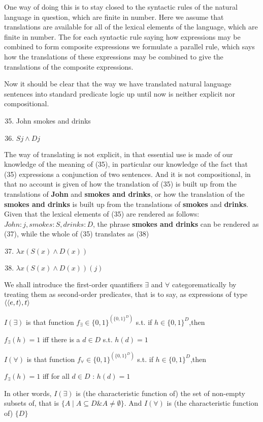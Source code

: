 \documentclass[11pt]{article}
\begin{document}
One way of doing this is to stay closed to the syntactic rules of the
natural language in question, which are finite in number. Here we assume
that translations are available for all of the lexical elements of the
language, which are finite in number. The for each syntactic rule saying how
expressions may be combined to form composite expressions we formulate a
parallel rule, which says how the translations of these expressions may be
combined to give the translations of the composite expressions.

Now it should be clear that the way we have translated natural language
sentences into standard predicate logic up until now is neither explicit nor
compositional.
\begin{enumerate}
\setcounter{enumi}{34}
\item John smokes and drinks
\item \(Sj\wedge Dj\)
\end{enumerate}


The way of translating is not explicit, in that essential use is made of our
knowledge of the meaning of (35), in particular our knowledge of the fact
that (35) expressions a conjunction of two sentences. And it is not
compositional, in that no account is given of how the translation of (35) is
built up from the translations of \textbf{John} and \textbf{smokes and drinks}, or how the
translation of the \textbf{smokes and drinks} is built up from the translations of
\textbf{smokes} and \textbf{drinks}. Given that the lexical elements of (35) are rendered as
follows: \(John:j,smokes:S,drinks:D\), the phrase \textbf{smokes and drinks} can be
rendered as (37), while the whole of (35) translates as (38)
\begin{enumerate}
\setcounter{enumi}{36}
\item \(\lambda x(S(x)\wedge D(x))\)
\item \(\lambda x(S(x)\wedge D(x))(j)\)
\end{enumerate}


We shall introduce the first-order quantifiers \(\exists\) and \(\forall\)
categorematically by treating them as second-order predicates, that is to
say, as expressions of type \(\langle\langle e,t\rangle,t\rangle\)
\begin{center}
\(I(\exists)\) is that function \(f_{\exists}\in\{0,1\}^{(\{0,1\}^D)}\) s.t.
if \(h\in\{0,1\}^D\),then \par
\(f_\exists(h)=1\) iff there is a \(d\in D\) s.t. \(h(d)=1\) \par
\(I(\forall)\) is that function \(f_{\forall}\in\{0,1\}^{(\{0,1\}^D)}\) s.t.
if \(h\in\{0,1\}^D\),then \par
\(f_\exists(h)=1\) iff for all \(d\in D\) : \(h(d)=1\) 
\end{center}
In other words, \(I(\exists)\) is (the characteristic function of) the set
of non-empty subsets of, that is \(\{A\mid A\subseteq D\&A\neq\emptyset\}\).
And \(I(\forall)\) is (the characteristic function of) \(\{D\}\)
\end{document}
